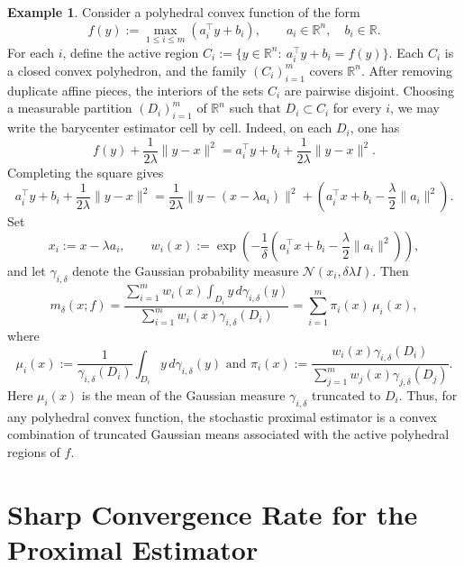 \documentclass[11pt]{article}
\newcommand{\1}{\mathds{1}}
\theoremstyle{definition}
\theoremstyle{remark}
\theoremstyle{definition}
\newtheorem{example}{Example}[section]
\newcommand{\R}{\mathbb{R}}
\begin{document}
\begin{example}
Consider a polyhedral convex function of the form
\[
f(y):=\max_{1\le i\le m}(a_i^\top y+b_i),
\qquad a_i\in\R^n,\quad b_i\in\R.
\]
For each \(i\), define the active region $C_i:=\{y\in\R^n:\ a_i^\top y+b_i=f(y)\}$. Each \(C_i\) is a closed convex polyhedron, and the family \((C_i)_{i=1}^m\)
covers \(\R^n\). After removing duplicate affine pieces, the interiors of
the sets \(C_i\) are pairwise disjoint. Choosing a measurable partition
\((D_i)_{i=1}^m\) of \(\R^n\) such that \(D_i\subset C_i\) for every \(i\),
we may write the barycenter estimator cell by cell. Indeed, on each \(D_i\), one has
\[
f(y)+\frac{1}{2\lambda}\|y-x\|^2
=
a_i^\top y+b_i+\frac{1}{2\lambda}\|y-x\|^2.
\]
Completing the square gives
\[
a_i^\top y+b_i+\frac{1}{2\lambda}\|y-x\|^2
=
\frac{1}{2\lambda}\|y-(x-\lambda a_i)\|^2
+
\left(
a_i^\top x+b_i-\frac{\lambda}{2}\|a_i\|^2
\right).
\]
Set
\[
x_i:=x-\lambda a_i,
\qquad
w_i(x):=
\exp\!\left(
-\frac{1}{\delta}
\left(
a_i^\top x+b_i-\frac{\lambda}{2}\|a_i\|^2
\right)
\right),
\]
and let \(\gamma_{i,\delta}\) denote the Gaussian probability measure
\(\mathcal N(x_i,\delta\lambda I)\). Then
\[
m_\delta(x;f)
=
\frac{\displaystyle\sum_{i=1}^m
w_i(x)\int_{D_i} y\,d\gamma_{i,\delta}(y)}
{\displaystyle\sum_{i=1}^m
w_i(x)\gamma_{i,\delta}(D_i)}=\sum_{i=1}^m \pi_i(x)\,\mu_i(x),
\]
where
\[
\mu_i(x):=
\frac{1}{\gamma_{i,\delta}(D_i)}
\int_{D_i} y\,d\gamma_{i,\delta}(y) \textrm{ and } \pi_i(x):=
\frac{w_i(x)\gamma_{i,\delta}(D_i)}
{\sum_{j=1}^m w_j(x)\gamma_{j,\delta}(D_j)}.
\]
Here $\mu_i(x)$ is the mean of the Gaussian measure \(\gamma_{i,\delta}\) truncated to \(D_i\). Thus, for any polyhedral convex function, the stochastic proximal estimator
is a convex combination of truncated Gaussian means associated with the
active polyhedral regions of \(f\).
\end{example}

\section{Sharp Convergence Rate for the Proximal Estimator}\label{weakly-convex}
\end{document}
